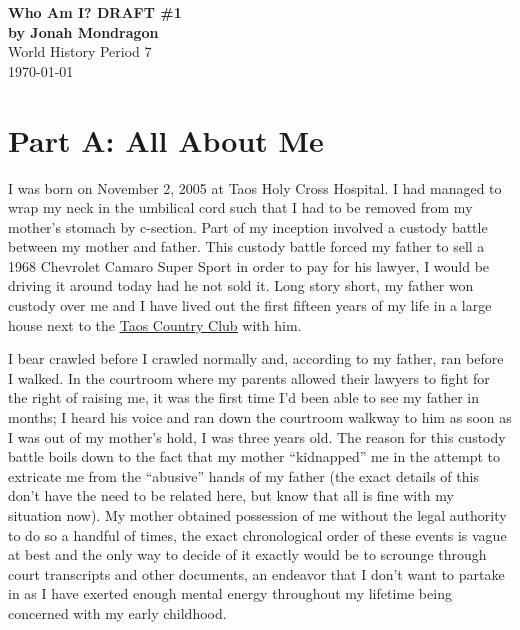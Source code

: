 \documentclass[12pt]{article}
\begin{document}
\doublespacing

\begin{titlepage}
    \begin{center}
        \vspace*{1.5in}
        {\huge\bfseries{Who Am I? DRAFT \#1}}\\
            {\bfseries{by Jonah Mondragon}}\\
            World History Period 7\\
            \today
    \end{center}
\end{titlepage}

\section*{Part A: All About Me}

I was born on November 2, 2005 at Taos Holy Cross Hospital.
I had managed to wrap my neck in the umbilical cord such that I had to be removed from my 
    mother's stomach by c-section.
Part of my inception involved a custody battle between my mother and father.
This custody battle forced my father to sell a 1968 Chevrolet Camaro Super Sport
    in order to pay for his lawyer, I would be driving it around today had he not sold it.
Long story short, my father won custody over me and I have lived out the first fifteen years of my 
    life in a large house next to the {\color{blue}\underline{\href{https://www.taoscountryclub.com/}{Taos Country Club}}} with him.

I bear crawled before I crawled normally and, according to my father, ran before I walked.
In the courtroom where my parents allowed their lawyers to fight for the right of raising me,
    it was the first time I'd been able to see my father in months; %
    I heard his voice and ran down the courtroom walkway to him as soon as I was out of 
    my mother's hold, I was three years old. %
The reason for this custody battle boils down to the fact that my mother ``kidnapped'' me in the
    attempt to extricate me from the ``abusive'' hands of my father (the exact details of this don't
    have the need to be related here, but know that all is fine with my situation now).
My mother obtained possession of me without the legal authority to do so a handful of times, the
    exact chronological order of these events is vague at best and the only way to decide of it
    exactly would be to scrounge through court transcripts and other documents, an endeavor
    that I don't want to partake in as I have exerted enough mental energy throughout my lifetime
    being concerned with my early childhood.
\end{document}

